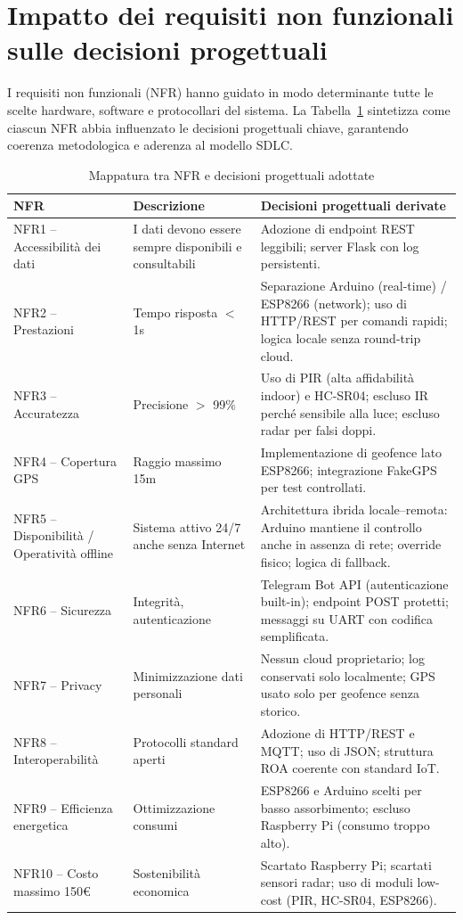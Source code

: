 \section{Impatto dei requisiti non funzionali sulle decisioni progettuali} I requisiti non funzionali (NFR) hanno guidato in modo determinante tutte le scelte hardware, software e protocollari del sistema. La Tabella~\ref{tab:nfr_decisions} sintetizza come ciascun NFR abbia influenzato le decisioni progettuali chiave, garantendo coerenza metodologica e aderenza al modello SDLC. 

\begin{table}[H] \centering \caption{Mappatura tra NFR e decisioni progettuali adottate} \label{tab:nfr_decisions} \renewcommand{\arraystretch}{1.35} \begin{tabularx}{\textwidth}{@{} p{3.5cm} X X@{}} \toprule \textbf{NFR} & \textbf{Descrizione} & \textbf{Decisioni progettuali \newline derivate} \\ \midrule NFR1 – Accessibilità dei dati & I dati devono essere sempre disponibili e consultabili & Adozione di endpoint REST leggibili; server Flask con log persistenti.\\ NFR2 – Prestazioni & Tempo risposta $<$ 1s & Separazione Arduino (real-time) / ESP8266 (network); uso di HTTP/REST per comandi rapidi; logica locale senza round-trip cloud. \\ NFR3 – Accuratezza & Precisione $>$ 99\% & Uso di PIR (alta affidabilità indoor) e HC-SR04; escluso IR perché sensibile alla luce; escluso radar per falsi doppi. \\ NFR4 – Copertura GPS & Raggio massimo 15m & Implementazione di geofence lato ESP8266; integrazione FakeGPS per test controllati. \\ NFR5 – Disponibilità / Operatività offline & Sistema attivo 24/7 anche senza Internet & Architettura ibrida locale–remota: Arduino mantiene il controllo anche in assenza di rete; override fisico; logica di fallback. \\ NFR6 – Sicurezza & Integrità, autenticazione & Telegram Bot API (autenticazione built-in); endpoint POST protetti; messaggi su UART con codifica semplificata. \\ NFR7 – Privacy & Minimizzazione dati personali & Nessun cloud proprietario; log conservati solo localmente; GPS usato solo per geofence senza storico. \\ NFR8 – Interoperabilità & Protocolli standard aperti & Adozione di HTTP/REST e MQTT; uso di JSON; struttura ROA coerente con standard IoT. \\ NFR9 – Efficienza energetica & Ottimizzazione consumi & ESP8266 e Arduino scelti per basso assorbimento; escluso Raspberry Pi (consumo troppo alto). \\ NFR10 – Costo massimo 150€ & Sostenibilità economica & Scartato Raspberry Pi; scartati sensori radar; uso di moduli low-cost (PIR, HC-SR04, ESP8266). \\ \bottomrule \end{tabularx} \end{table}
